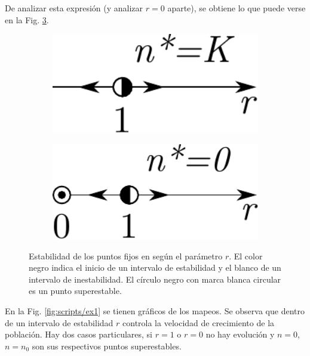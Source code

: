 \documentclass[twocolumn,aps,prl]{revtex4-1}
\begin{document}
De analizar esta expresión (y analizar $r=0$ aparte), se obtiene lo que puede verse en la Fig. \ref{fig:estabilidad}.

\begin{figure}[ht!]
    \centering
    \begin{subfigure}[b]{0.3\linewidth}
        \centering
        \includegraphics[width = 0.999\textwidth]{figuras/estabilidadK.pdf}
        \caption{}
        \label{fig:figuras/estabilidadK}
    \end{subfigure}\qquad\qquad\quad
    \begin{subfigure}[b]{0.3\linewidth}
        \centering
        \includegraphics[width = 0.999\textwidth]{figuras/estable0.pdf}
        \caption{}
        \label{fig:figuras/estable0}
    \end{subfigure}\quad
    \caption{Estabilidad de los puntos fijos en según el parámetro $r$. El color negro indica el inicio de un intervalo de estabilidad y el blanco de un intervalo de inestabilidad. El círculo negro con marca blanca circular es un punto superestable.}
    \label{fig:estabilidad}
\end{figure}

En la Fig. \ref{fig:scripts/ex1} se tienen gráficos de los mapeos. Se observa que dentro de un intervalo de estabilidad $r$ controla la velocidad de crecimiento de la población. Hay dos casos particulares, si $r=1$ o $r=0$ no hay evolución y $n=0$, $n=n_0$ son sus respectivos puntos superestables. 
\end{document}
